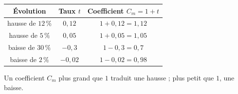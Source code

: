 \documentclass[11pt,a4paper]{article}
\begin{document}
\begin{center}
{\renewcommand{\arraystretch}{1.8}\setlength{\tabcolsep}{12pt}
\begin{tabular}{|c|c|c|}
\hline
\textbf{Évolution} & \textbf{Taux $t$} & \textbf{Coefficient $C_m=1+t$}\\
\hline
hausse de $12\,\%$ & $0{,}12$ & $1+0{,}12=1{,}12$\\
\hline
hausse de $5\,\%$ & $0{,}05$ & $1+0{,}05=1{,}05$\\
\hline
baisse de $30\,\%$ & $-0{,}3$ & $1-0{,}3=0{,}7$\\
\hline
baisse de $2\,\%$ & $-0{,}02$ & $1-0{,}02=0{,}98$\\
\hline
\end{tabular}}
\end{center}
Un coefficient $C_m$ plus grand que $1$ traduit une hausse ; plus petit que $1$, une baisse.
\end{document}
